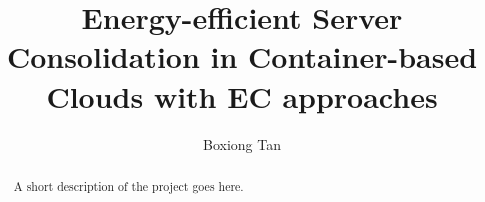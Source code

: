 \documentclass[11pt
              , a4paper
              , twoside
              , openright
              ]{report}
\title{Energy-efficient Server Consolidation in Container-based Clouds with EC approaches}
\author{Boxiong Tan}
\date{}
\begin{document}



\begin{abstract}

A short description of the project goes here.

\end{abstract}


\maketitle

% 

\tableofcontents



\mainmatter









\backmatter



%


\end{document}
